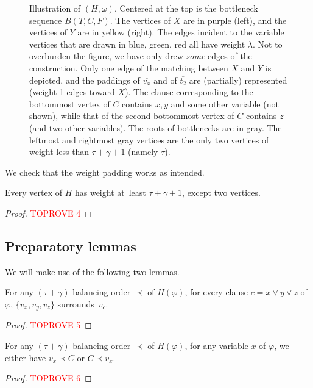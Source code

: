 \documentclass[a4paper,UKenglish,cleveref,hyperref,autoref]{lipics-v2021}
\begin{document}
\begin{figure}[h!]
{\begin{tikzpicture}[scale=.86, vertex/.style={draw, circle, minimum size=3mm, inner sep=0pt}, every path/.style={thick}]
\end{tikzpicture}
}
\caption{Illustration of $(H, \omega)$.
  Centered at the top is the bottleneck sequence $B(T, C, F)$.
  The vertices of $X$ are in purple (left), and the vertices of $Y$ are in yellow (right).
  The edges incident to the variable vertices that are drawn in blue, green, red all have weight $\lambda$.
  Not to overburden the figure, we have only drew \emph{some} edges of the construction.
  Only one edge of the matching between $X$ and $Y$ is depicted, and the paddings of $\overline{v_x}$ and of $\overline{t_2}$ are (partially) represented (weight-1 edges toward $X$).
  The clause corresponding to the bottommost vertex of $C$ contains $x, y$ and some other variable (not shown), while that of the second bottommost vertex of $C$ contains $z$ (and two other variables).
  The roots of bottlenecks are in gray.
  The leftmost and rightmost gray vertices are the only two vertices of weight less than $\tau+\gamma+1$ (namely $\tau$).
 }
\label{fig:first-red}
\end{figure}

\medskip

We check that the weight padding works as intended.

\begin{lemma}\label{lem:saturation}
Every vertex of $H$ has weight at~least $\tau + \gamma + 1$, except two vertices.
\end{lemma}
\begin{proof}\textcolor{red}{TOPROVE 4}\end{proof}

\subsection{Preparatory lemmas}

We will make use of the following two lemmas.

\begin{lemma}\label{lem:clause-surrounding}
For any $(\tau + \gamma)$-balancing order $\prec$ of $H(\varphi)$, for every clause $c = x \lor y \lor z$ of~$\varphi$, $\{v_x, v_y, v_z\}$ surrounds~$v_c$.
\end{lemma}
\begin{proof}\textcolor{red}{TOPROVE 5}\end{proof}

\begin{lemma}\label{lem:well-defined-order}
For any $(\tau+\gamma)$-balancing order $\prec$ of $H(\varphi)$, for any variable $x$ of $\varphi$, we either have $v_x \prec C$ or $C \prec v_x$. 
\end{lemma}
\begin{proof}\textcolor{red}{TOPROVE 6}\end{proof}
\end{document}
